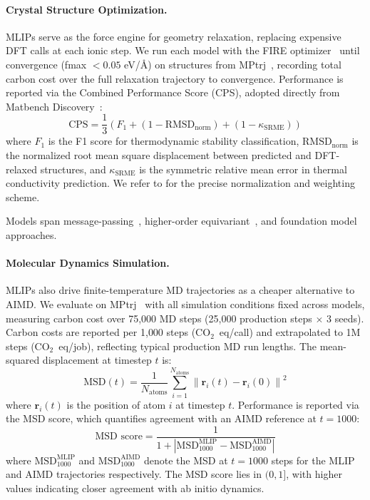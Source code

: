 \documentclass{article}
\theoremstyle{plain}
\theoremstyle{definition}
\theoremstyle{remark}
\begin{document}
\paragraph{Crystal Structure Optimization.}
MLIPs serve as the force engine for geometry relaxation, replacing expensive DFT calls at each ionic step. We run each model with the FIRE optimizer~\cite{bitzek2006structural} until convergence (fmax $< 0.05$ eV/\AA) on structures from MPtrj~\cite{deng2023chgnet}, recording total carbon cost over the full relaxation trajectory to convergence. Performance is reported via the Combined Performance Score (CPS), adopted directly from Matbench Discovery~\cite{riebesell2025framework}:
\begin{equation}
    \text{CPS} = \frac{1}{3}\left( F_1 + (1 - \text{RMSD}_\text{norm}) + 
    (1 - \kappa_\text{SRME}) \right)
    \label{eq:cps}
\end{equation}
where $F_1$ is the F1 score for thermodynamic stability classification, $\text{RMSD}_\text{norm}$ is the normalized root mean square displacement between predicted and DFT-relaxed structures, and $\kappa_\text{SRME}$ is the symmetric relative mean error in thermal conductivity prediction. We refer to \citet{riebesell2025framework} for the precise normalization and weighting scheme. 

Models span message-passing~\cite{deng2023chgnet, batatia2022mace, koker2025training}, higher-order equivariant~\cite{batatia2022mace}, and foundation model~\cite{zhang2025graph, neumann2024orb, fu2025learning} approaches.

\paragraph{Molecular Dynamics Simulation.}
MLIPs also drive finite-temperature MD trajectories as a cheaper alternative to AIMD. We evaluate on MPtrj~\cite{deng2023chgnet} with all simulation conditions
fixed across models, measuring carbon cost over 75{,}000 MD steps (25{,}000 production steps $\times$ 3 seeds). Carbon costs are reported per 1{,}000 steps (CO$_2$~eq/call) and extrapolated to 1M steps (CO$_2$~eq/job), reflecting typical production MD run lengths. The mean-squared displacement at 
timestep $t$ is:
\begin{equation}
    \text{MSD}(t) = \frac{1}{N_\text{atoms}} \sum_{i=1}^{N_\text{atoms}} 
    \left\lVert \mathbf{r}_i(t) - \mathbf{r}_i(0) \right\rVert^2
    \label{eq:msd}
\end{equation}
where $\mathbf{r}_i(t)$ is the position of atom $i$ at timestep $t$. Performance is reported via the MSD score, which quantifies agreement with an AIMD reference at $t = 1000$:
\begin{equation}
    \text{MSD score} = \frac{1}{1 + \left| \text{MSD}_{1000}^\text{MLIP} 
    - \text{MSD}_{1000}^\text{AIMD} \right|}
    \label{eq:msd_score}
\end{equation}
where $\text{MSD}_{1000}^\text{MLIP}$ and $\text{MSD}_{1000}^\text{AIMD}$ denote the MSD at $t = 1000$ steps for the MLIP and AIMD trajectories respectively. The MSD score lies in $(0, 1]$, with higher values indicating closer agreement with ab initio dynamics. 
\end{document}
